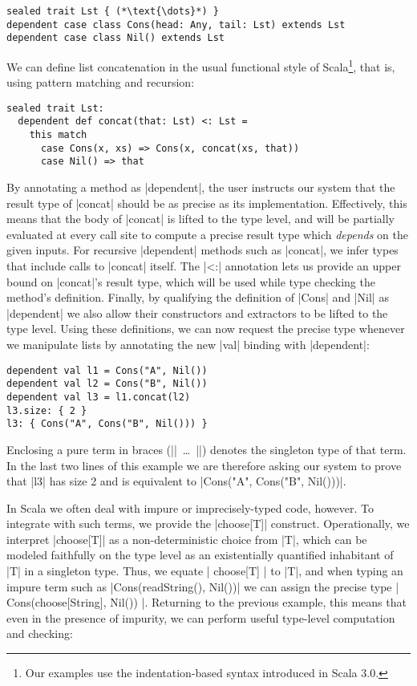 \begin{lstlisting}
sealed trait Lst { (*\text{\dots}*) }
dependent case class Cons(head: Any, tail: Lst) extends Lst
dependent case class Nil() extends Lst
\end{lstlisting}

\noindent
We can define list concatenation in the usual functional style of Scala\footnote{Our examples use the indentation-based syntax introduced in Scala 3.0.}, that is, using pattern matching and recursion:

\begin{lstlisting}
sealed trait Lst:
  dependent def concat(that: Lst) <: Lst =
    this match
      case Cons(x, xs) => Cons(x, concat(xs, that))
      case Nil() => that
\end{lstlisting}

\noindent
By annotating a method as |dependent|, the user instructs our system that the result type of |concat| should be as precise as its implementation.
Effectively, this means that the body of |concat| is lifted to the type level, and will be partially evaluated at every call site to compute a precise result type which \emph{depends} on the given inputs.
For recursive |dependent| methods such as |concat|, we infer types that include calls to |concat| itself.
The |<:| annotation lets us provide an upper bound on |concat|'s result type, which will be used while type checking the method's definition.
Finally, by qualifying the definition of |Cons| and |Nil| as |dependent| we also allow their constructors and extractors to be lifted to the type level.
Using these definitions, we can now request the precise type whenever we manipulate lists by annotating the new |val| binding with |dependent|:

\begin{lstlisting}
dependent val l1 = Cons("A", Nil())
dependent val l2 = Cons("B", Nil())
dependent val l3 = l1.concat(l2)
l3.size: { 2 }
l3: { Cons("A", Cons("B", Nil())) }
\end{lstlisting}

Enclosing a pure term in braces (|{|~\ldots{}~|}|) denotes the singleton type of that term.
In the last two lines of this example we are therefore asking our system to prove that |l3| has size 2 and is equivalent to |Cons("A", Cons("B", Nil()))|.

In Scala we often deal with impure or imprecisely-typed code, however.
To integrate with such terms, we provide the |choose[T]| construct.
Operationally, we interpret |choose[T]| as a non-deterministic choice from |T|, which can be modeled faithfully on the type level as an existentially quantified inhabitant of |T| in a singleton type.
Thus, we equate |{ choose[T] }| to |T|, and when typing an impure term such as |Cons(readString(), Nil())| we can assign the precise type |{ Cons(choose[String], Nil()) }|.
Returning to the previous example, this means that even in the presence of impurity, we can perform useful type-level computation and checking:

